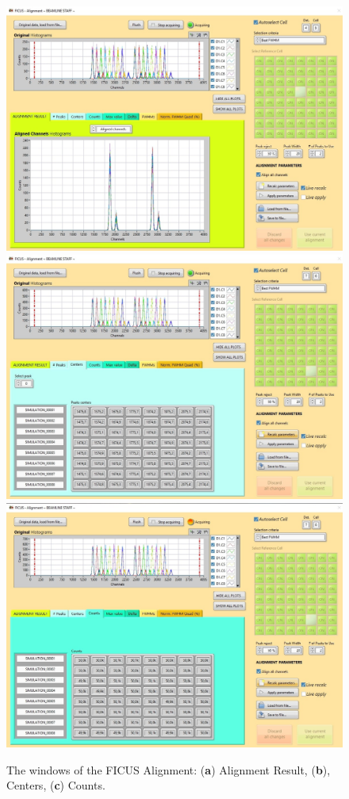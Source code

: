 \documentclass[a4paper,12pt,oneside,pdflatex,italian,final,twocolumn]{article}
\begin{document}
\begin{figure}[h]
\centering
\subfloat
{\includegraphics[width=.6\textwidth]{Cattura82.jpg}} \\
\subfloat
{\includegraphics[width=.6\textwidth]{Cattura84.jpg}} \\
\subfloat
{\includegraphics[width=.6\textwidth]{Cattura85.jpg}} \\
\caption{The windows of the FICUS Alignment: (\textbf{a}) Alignment Result, (\textbf{b}), Centers, (\textbf{c}) Counts.}\label{fig:fig48}
\end{figure}
\end{document}

